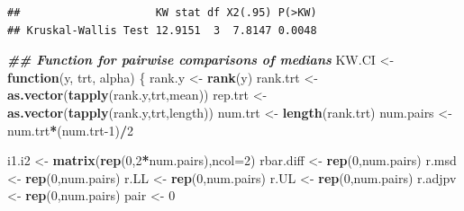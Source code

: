 \documentclass[
]{book}
\newenvironment{Shaded}{\begin{snugshade}}{\end{snugshade}}
\newcommand{\AttributeTok}[1]{\textcolor[rgb]{0.13,0.29,0.53}{#1}}
\newcommand{\ControlFlowTok}[1]{\textcolor[rgb]{0.13,0.29,0.53}{\textbf{#1}}}
\newcommand{\DecValTok}[1]{\textcolor[rgb]{0.00,0.00,0.81}{#1}}
\newcommand{\DocumentationTok}[1]{\textcolor[rgb]{0.56,0.35,0.01}{\textbf{\textit{#1}}}}
\newcommand{\FunctionTok}[1]{\textcolor[rgb]{0.13,0.29,0.53}{\textbf{#1}}}
\newcommand{\NormalTok}[1]{#1}
\newcommand{\OtherTok}[1]{\textcolor[rgb]{0.56,0.35,0.01}{#1}}
\newcommand{\SpecialCharTok}[1]{\textcolor[rgb]{0.81,0.36,0.00}{\textbf{#1}}}
\begin{document}
\begin{verbatim}
##                     KW stat df X2(.95) P(>KW)
## Kruskal-Wallis Test 12.9151  3  7.8147 0.0048
\end{verbatim}

\begin{Shaded}
\begin{Highlighting}[]
\DocumentationTok{\#\# Function for pairwise comparisons of medians}
\NormalTok{KW.CI }\OtherTok{\textless{}{-}} \ControlFlowTok{function}\NormalTok{(y, trt, alpha) \{}
\NormalTok{rank.y }\OtherTok{\textless{}{-}} \FunctionTok{rank}\NormalTok{(y)}
\NormalTok{rank.trt }\OtherTok{\textless{}{-}} \FunctionTok{as.vector}\NormalTok{(}\FunctionTok{tapply}\NormalTok{(rank.y,trt,mean))}
\NormalTok{rep.trt }\OtherTok{\textless{}{-}} \FunctionTok{as.vector}\NormalTok{(}\FunctionTok{tapply}\NormalTok{(rank.y,trt,length))}
\NormalTok{num.trt }\OtherTok{\textless{}{-}} \FunctionTok{length}\NormalTok{(rank.trt)}
\NormalTok{num.pairs }\OtherTok{\textless{}{-}}\NormalTok{ num.trt}\SpecialCharTok{*}\NormalTok{(num.trt}\DecValTok{{-}1}\NormalTok{)}\SpecialCharTok{/}\DecValTok{2}

\NormalTok{i1.i2 }\OtherTok{\textless{}{-}} \FunctionTok{matrix}\NormalTok{(}\FunctionTok{rep}\NormalTok{(}\DecValTok{0}\NormalTok{,}\DecValTok{2}\SpecialCharTok{*}\NormalTok{num.pairs),}\AttributeTok{ncol=}\DecValTok{2}\NormalTok{)}
\NormalTok{rbar.diff }\OtherTok{\textless{}{-}} \FunctionTok{rep}\NormalTok{(}\DecValTok{0}\NormalTok{,num.pairs)}
\NormalTok{r.msd }\OtherTok{\textless{}{-}} \FunctionTok{rep}\NormalTok{(}\DecValTok{0}\NormalTok{,num.pairs)}
\NormalTok{r.LL }\OtherTok{\textless{}{-}} \FunctionTok{rep}\NormalTok{(}\DecValTok{0}\NormalTok{,num.pairs)}
\NormalTok{r.UL }\OtherTok{\textless{}{-}} \FunctionTok{rep}\NormalTok{(}\DecValTok{0}\NormalTok{,num.pairs)}
\NormalTok{r.adjpv }\OtherTok{\textless{}{-}} \FunctionTok{rep}\NormalTok{(}\DecValTok{0}\NormalTok{,num.pairs)}
\NormalTok{pair }\OtherTok{\textless{}{-}} \DecValTok{0}


\end{Highlighting}
\end{Shaded}
\end{document}
